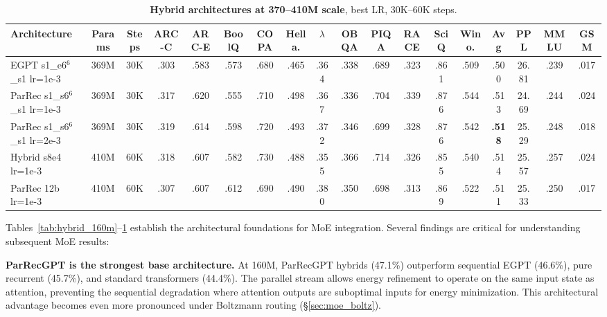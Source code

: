 \documentclass[oneside]{article}
\begin{document}
\begin{table}[t]
\centering
\caption{\textbf{Hybrid architectures at 370--410M scale}, best LR, 30K--60K steps.}
\label{tab:hybrid_400m}
\begin{adjustbox}{max width=\textwidth}
\begin{tabular}{l|c|c|ccccccccccc|c|c|cc}
\toprule
\textbf{Architecture} & \textbf{Params} & \textbf{Steps} & \textbf{ARC-C} & \textbf{ARC-E} & \textbf{BoolQ} & \textbf{COPA} & \textbf{Hella.} & \textbf{$\lambda$} & \textbf{OBQA} & \textbf{PIQA} & \textbf{RACE} & \textbf{SciQ} & \textbf{Wino.} & \textbf{Avg} & \textbf{PPL} & \textbf{MMLU} & \textbf{GSM} \\
\midrule
EGPT s1\_e6$^6$\_s1 lr=1e-3      & 369M & 30K & .303 & .583 & .573 & .680 & .465 & .364 & .338 & .689 & .323 & .861 & .509 & .500 & 26.81 & .239 & .017 \\
ParRec s1\_s6$^6$\_s1 lr=1e-3    & 369M & 30K & .317 & .620 & .555 & .710 & .498 & .367 & .336 & .704 & .339 & .876 & .544 & .513 & 24.69 & .244 & .024 \\
ParRec s1\_s6$^6$\_s1 lr=2e-3    & 369M & 30K & .319 & .614 & .598 & .720 & .493 & .372 & .346 & .699 & .328 & .876 & .542 & \textbf{.518} & 25.29 & .248 & .018 \\
\midrule
Hybrid s8e4 lr=1e-3              & 410M & 60K & .318 & .607 & .582 & .730 & .488 & .355 & .366 & .714 & .326 & .855 & .540 & .514 & 25.57 & .257 & .024 \\
ParRec 12b lr=1e-3               & 410M & 60K & .307 & .607 & .612 & .690 & .490 & .380 & .350 & .698 & .313 & .869 & .522 & .511 & 25.33 & .250 & .017 \\
\bottomrule
\end{tabular}
\end{adjustbox}
\end{table}

Tables~\ref{tab:hybrid_160m}--\ref{tab:hybrid_400m} establish the architectural foundations for MoE integration. Several findings are critical for understanding subsequent MoE results:

\textbf{ParRecGPT is the strongest base architecture.} At 160M, ParRecGPT hybrids (47.1\%) outperform sequential EGPT (46.6\%), pure recurrent (45.7\%), and standard transformers (44.4\%). The parallel stream allows energy refinement to operate on the same input state as attention, preventing the sequential degradation where attention outputs are suboptimal inputs for energy minimization. This architectural advantage becomes even more pronounced under Boltzmann routing (\S\ref{sec:moe_boltz}).
\end{document}
